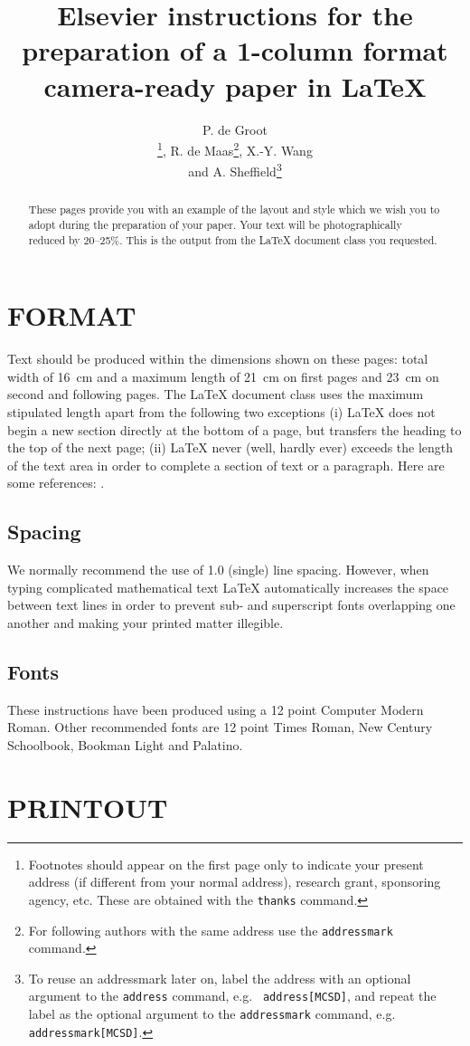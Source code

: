 \documentclass[fleqn,12pt,twoside]{article}
\title{Elsevier instructions for the preparation of a 
       1-column format camera-ready paper in \LaTeX}
\author{P. de Groot\address[MCSD]{Mathematics and Computer Science Section, 
        Elsevier Science B.V., \\ 
        P.O. Box 103, 1000 AC Amsterdam, The Netherlands}%
        \thanks{Footnotes should appear on the first page only to
                indicate your present address (if different from your
                normal address), research grant, sponsoring agency, etc.
                These are obtained with the {\tt\ttbs thanks} command.},
        R. de Maas\addressmark\thanks{For following authors with the same
                address use the {\tt\ttbs addressmark} command.},
        X.-Y. Wang\address{Economics Department, University of Winchester, \\
        2 Finch Road, Winchester, Hampshire P3L T19, United Kingdom}
        and
        A. Sheffield\addressmark[MCSD]\thanks{To reuse an addressmark
                later on, label the address with an optional argument to the
                {\tt \ttbs address} command, e.g. {\tt\ttbs
                address[MCSD]}, and repeat the label
                as the optional argument to the {\tt\ttbs addressmark}
                command, e.g. {\tt\ttbs addressmark[MCSD]}.}}
\begin{document}
\maketitle

\begin{abstract}
These pages provide you with an example of the layout and style which
we wish you to adopt during the preparation of your paper. Your text
will be photographically reduced by 20--25\%. This is the output from
the \LaTeX{} document class you requested.
\end{abstract}

\section{FORMAT}

Text should be produced within the dimensions shown on these pages:
total width of 16~cm and a maximum length of 21~cm on first pages and
23~cm on second and following pages. The \LaTeX{} document class uses
the maximum stipulated length apart from the following two exceptions
(i) \LaTeX{} does not begin a new section directly at the bottom of a
page, but transfers the heading to the top of the next page; (ii)
\LaTeX{} never (well, hardly ever) exceeds the length of the text area
in order to complete a section of text or a paragraph.
Here are some references: \cite{Scho70,Mazu84}.

\subsection{Spacing}

We normally recommend the use of 1.0 (single) line spacing. However,
when typing complicated mathematical text \LaTeX{} automatically
increases the space between text lines in order to prevent sub- and
superscript fonts overlapping one another and making your printed
matter illegible.

\subsection{Fonts}

These instructions have been produced using a 12 point Computer Modern
Roman. Other recommended fonts are 12 point Times Roman, New Century
Schoolbook, Bookman Light and Palatino.

\section{PRINTOUT}
\end{document}
